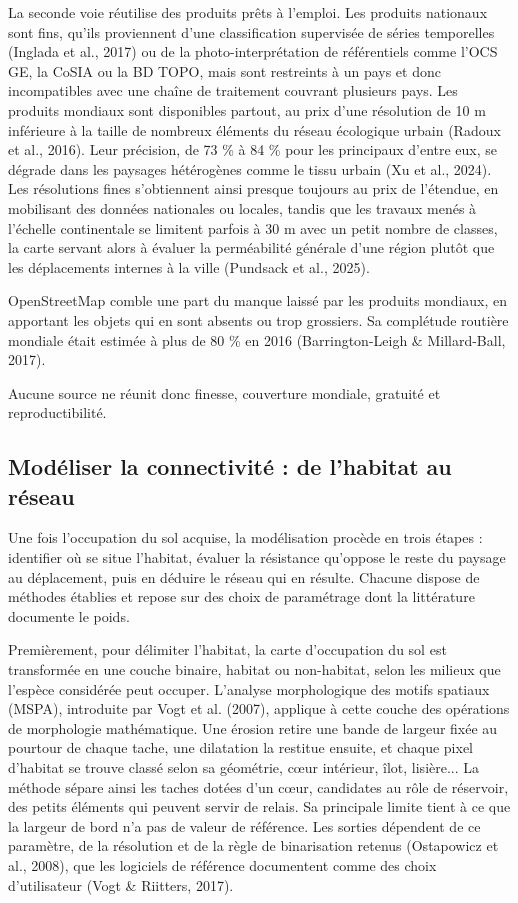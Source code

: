 \documentclass[a4paper,12pt]{report}
\begin{document}
La seconde voie réutilise des produits prêts à l'emploi. Les produits nationaux sont fins, qu'ils proviennent d'une classification supervisée de séries temporelles (Inglada et al., 2017) ou de la photo-interprétation de référentiels comme l'OCS GE, la CoSIA ou la BD TOPO, mais sont restreints à un pays et donc incompatibles avec une chaîne de traitement couvrant plusieurs pays. Les produits mondiaux sont disponibles partout, au prix d'une résolution de 10 m inférieure à la taille de nombreux éléments du réseau écologique urbain (Radoux et al., 2016). Leur précision, de 73 \% à 84 \% pour les principaux d'entre eux, se dégrade dans les paysages hétérogènes comme le tissu urbain (Xu et al., 2024). Les résolutions fines s'obtiennent ainsi presque toujours au prix de l'étendue, en mobilisant des données nationales ou locales, tandis que les travaux menés à l'échelle continentale se limitent parfois à 30 m avec un petit nombre de classes, la carte servant alors à évaluer la perméabilité générale d'une région plutôt que les déplacements internes à la ville (Pundsack et al., 2025).

OpenStreetMap comble une part du manque laissé par les produits mondiaux, en apportant les objets qui en sont absents ou trop grossiers. Sa complétude routière mondiale était estimée à plus de 80 \% en 2016 (Barrington-Leigh \& Millard-Ball, 2017).

Aucune source ne réunit donc finesse, couverture mondiale, gratuité et reproductibilité.

\subsection{Modéliser la connectivité : de l'habitat au réseau}
Une fois l'occupation du sol acquise, la modélisation procède en trois étapes : identifier où se situe l'habitat, évaluer la résistance qu'oppose le reste du paysage au déplacement, puis en déduire le réseau qui en résulte. Chacune dispose de méthodes établies et repose sur des choix de paramétrage dont la littérature documente le poids.

Premièrement, pour délimiter l'habitat, la carte d'occupation du sol est transformée en une couche binaire, habitat ou non-habitat, selon les milieux que l'espèce considérée peut occuper. L'analyse morphologique des motifs spatiaux (MSPA), introduite par Vogt et al. (2007), applique à cette couche des opérations de morphologie mathématique. Une érosion retire une bande de largeur fixée au pourtour de chaque tache, une dilatation la restitue ensuite, et chaque pixel d'habitat se trouve classé selon sa géométrie, cœur intérieur, îlot, lisière... La méthode sépare ainsi les taches dotées d'un cœur, candidates au rôle de réservoir, des petits éléments qui peuvent servir de relais. Sa principale limite tient à ce que la largeur de bord n'a pas de valeur de référence. Les sorties dépendent de ce paramètre, de la résolution et de la règle de binarisation retenus (Ostapowicz et al., 2008), que les logiciels de référence documentent comme des choix d'utilisateur (Vogt \& Riitters, 2017).
\end{document}
